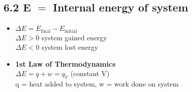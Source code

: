 \subsection{6.2 E $=$ Internal energy of system}
    \begin{itemize}
        \item $\Delta E = E_\text{final} - E_\text{initial}$\\
            $\Delta E > 0$ system gained energy\\
            $\Delta E < 0$ system lost energy
        \item \textbf{1st Law of Thermodynamics}\\
            $\Delta E = q + w = q_V$ (constant V)\\ 
            q = heat added to system, w = work done on system
    \end{itemize}
    \vspace*{0.0em}